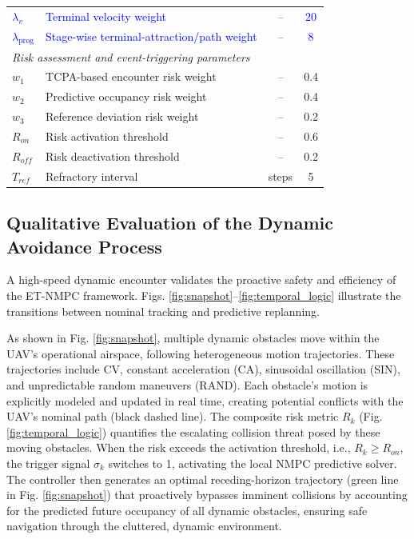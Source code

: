 \documentclass[lettersize,journal]{IEEEtran}
\begin{document}
\begin{table}[t]
{\begin{tabular}{l l c c}
			\textcolor{blue}{$\lambda_v$} & \textcolor{blue}{Terminal velocity weight} & \textcolor{blue}{--} & \textcolor{blue}{20} \\
			\textcolor{blue}{$\lambda_{\text{prog}}$} & \textcolor{blue}{Stage-wise terminal-attraction/path weight} & \textcolor{blue}{--} & \textcolor{blue}{8} \\
			\midrule
			\multicolumn{4}{l}{\textit{Risk assessment and event-triggering parameters}} \\
			\midrule
			$w_1$ & TCPA-based encounter risk weight & -- & 0.4 \\
			$w_2$ & Predictive occupancy risk weight & -- & 0.4 \\
			$w_3$ & Reference deviation risk weight & -- & 0.2 \\
			$R_{on}$ & Risk activation threshold & -- & 0.6 \\
			$R_{off}$ & Risk deactivation threshold & -- & 0.2 \\
			$T_{ref}$ & Refractory interval & steps & 5 \\
			\bottomrule
		\end{tabular}%
	}
\end{table}

\subsection{Qualitative Evaluation of the Dynamic Avoidance Process}

A high-speed dynamic encounter validates the proactive safety and efficiency of the ET-NMPC framework. Figs. \ref{fig:snapshot}--\ref{fig:temporal_logic} illustrate the transitions between nominal tracking and predictive replanning.

As shown in Fig. \ref{fig:snapshot}, multiple dynamic obstacles move within the UAV’s operational airspace, following heterogeneous motion trajectories. These trajectories include CV, constant acceleration (CA), sinusoidal oscillation (SIN), and unpredictable random maneuvers (RAND). Each obstacle’s motion is explicitly modeled and updated in real time, creating potential conflicts with the UAV’s nominal path (black dashed line). The composite risk metric $R_k$ (Fig. \ref{fig:temporal_logic}) quantifies the escalating collision threat posed by these moving obstacles. When the risk exceeds the activation threshold, i.e., $R_k \ge R_{on}$, the trigger signal $\sigma_k$ switches to 1, activating the local NMPC predictive solver. The controller then generates an optimal receding-horizon trajectory (green line in Fig. \ref{fig:snapshot}) that proactively bypasses imminent collisions by accounting for the predicted future occupancy of all dynamic obstacles, ensuring safe navigation through the cluttered, dynamic environment.
\end{document}
